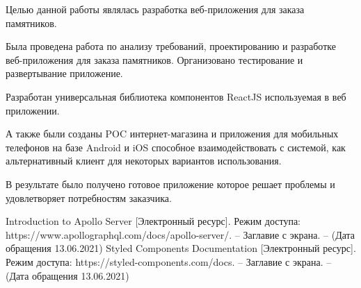 \documentclass[a4paper,article,14pt]{extarticle}
\begin{document}

Целью данной работы являлась разработка веб-приложения для заказа памятников.

Была проведена работа по анализу требований, проектированию и разработке веб-приложения для заказа памятников.
Организовано тестирование и развертывание приложение.

Разработан универсальная библиотека компонентов ReactJS используемая в веб приложении.

А также были созданы POC интернет-магазина и приложения для мобильных телефонов на базе Android и iOS способное взаимодействовать с системой,
как альтернативный клиент для некоторых вариантов использования.

В результате было получено готовое приложение которое решает проблемы и удовлетворяет потребностям заказчика.
\pagebreak

\begin{thebibliography}{1}
     Introduction to Apollo Server [Электронный ресурс]. Режим доступа: https://www.apollographql.com/docs/apollo-server/. – Заглавие с экрана. – (Дата обращения 13.06.2021)
     Styled Components Documentation [Электронный ресурс]. Режим доступа: https://styled-components.com/docs. – Заглавие с экрана. – (Дата обращения 13.06.2021)
\end{thebibliography}
\end{document}
